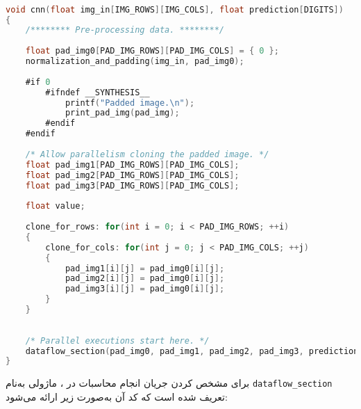 \begin{latin}
\begin{lstlisting}[language=C,caption={HLS Implementation of \texttt{CNN} Top Module}]

void cnn(float img_in[IMG_ROWS][IMG_COLS], float prediction[DIGITS])
{
	/******** Pre-processing data. ********/
	
	float pad_img0[PAD_IMG_ROWS][PAD_IMG_COLS] = { 0 };
	normalization_and_padding(img_in, pad_img0);
	
	#if 0
		#ifndef __SYNTHESIS__
			printf("Padded image.\n");
			print_pad_img(pad_img);
		#endif
	#endif
	
	/* Allow parallelism cloning the padded image. */
	float pad_img1[PAD_IMG_ROWS][PAD_IMG_COLS];
	float pad_img2[PAD_IMG_ROWS][PAD_IMG_COLS];
	float pad_img3[PAD_IMG_ROWS][PAD_IMG_COLS];
	
	float value;
	
	clone_for_rows: for(int i = 0; i < PAD_IMG_ROWS; ++i)
	{
		clone_for_cols: for(int j = 0; j < PAD_IMG_COLS; ++j)
		{
			pad_img1[i][j] = pad_img0[i][j];
			pad_img2[i][j] = pad_img0[i][j];
			pad_img3[i][j] = pad_img0[i][j];
		}
	}
	
	
	/* Parallel executions start here. */
	dataflow_section(pad_img0, pad_img1, pad_img2, pad_img3, prediction);
}

\end{lstlisting}
\end{latin}




برای مشخص کردن جریان انجام محاسبات در ، ماژولی به‌نام \texttt{dataflow\_section} تعریف شده است که کد آن به‌صورت زیر ارائه می‌شود:


